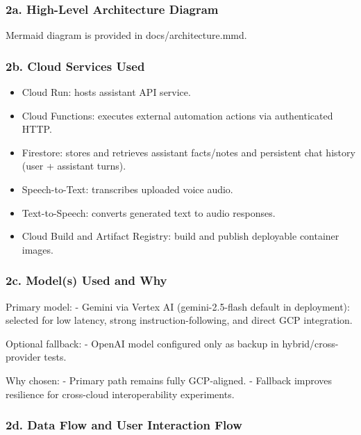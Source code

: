 \documentclass[
]{article}
\providecommand{\tightlist}{%
  \setlength{\itemsep}{0pt}\setlength{\parskip}{0pt}}
\begin{document}
\subsubsection{2a. High-Level Architecture
Diagram}\label{a.-high-level-architecture-diagram}

Mermaid diagram is provided in docs/architecture.mmd.

\subsubsection{2b. Cloud Services Used}\label{b.-cloud-services-used}

\begin{itemize}
\tightlist
\item
  Cloud Run: hosts assistant API service.
\item
  Cloud Functions: executes external automation actions via
  authenticated HTTP.
\item
  Firestore: stores and retrieves assistant facts/notes and persistent
  chat history (user + assistant turns).
\item
  Speech-to-Text: transcribes uploaded voice audio.
\item
  Text-to-Speech: converts generated text to audio responses.
\item
  Cloud Build and Artifact Registry: build and publish deployable
  container images.
\end{itemize}

\subsubsection{2c. Model(s) Used and Why}\label{c.-models-used-and-why}

Primary model: - Gemini via Vertex AI (gemini-2.5-flash default in
deployment): selected for low latency, strong instruction-following, and
direct GCP integration.

Optional fallback: - OpenAI model configured only as backup in
hybrid/cross-provider tests.

Why chosen: - Primary path remains fully GCP-aligned. - Fallback
improves resilience for cross-cloud interoperability experiments.

\subsubsection{2d. Data Flow and User Interaction
Flow}\label{d.-data-flow-and-user-interaction-flow}
\end{document}
